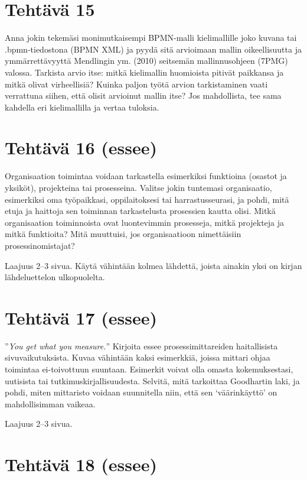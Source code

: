 \documentclass[
  finnish,
  letterpaper,
  DIV=11,
  numbers=noendperiod,
  oneside]{scrreprt}
\begin{document}
\section{Tehtävä 15}\label{tehtuxe4vuxe4-15}

Anna jokin tekemäsi monimutkaisempi BPMN-malli kielimallille joko kuvana
tai .bpmn-tiedostona (BPMN XML) ja pyydä sitä arvioimaan mallin
oikeellisuutta ja ymmärrettävyyttä Mendlingin ym. (2010) seitsemän
mallinnusohjeen (7PMG) valossa. Tarkista arvio itse: mitkä kielimallin
huomioista pitivät paikkansa ja mitkä olivat virheellisiä? Kuinka paljon
työtä arvion tarkistaminen vaati verrattuna siihen, että olisit
arvioinut mallin itse? Jos mahdollista, tee sama kahdella eri
kielimallilla ja vertaa tuloksia.

\section{Tehtävä 16 (essee)}\label{tehtuxe4vuxe4-16-essee}

Organisaation toimintaa voidaan tarkastella esimerkiksi funktioina
(osastot ja yksiköt), projekteina tai prosesseina. Valitse jokin
tuntemasi organisaatio, esimerkiksi oma työpaikkasi, oppilaitoksesi tai
harrastusseurasi, ja pohdi, mitä etuja ja haittoja sen toiminnan
tarkastelusta prosessien kautta olisi. Mitkä organisaation toiminnoista
ovat luontevimmin prosesseja, mitkä projekteja ja mitkä funktioita? Mitä
muuttuisi, jos organisaatioon nimettäisiin prosessinomistajat?

Laajuus 2--3 sivua. Käytä vähintään kolmea lähdettä, joista ainakin yksi
on kirjan lähdeluettelon ulkopuolelta.

\section{Tehtävä 17 (essee)}\label{tehtuxe4vuxe4-17-essee}

''\emph{You get what you measure.}'' Kirjoita essee prosessimittareiden
haitallisista sivuvaikutuksista. Kuvaa vähintään kaksi esimerkkiä,
joissa mittari ohjaa toimintaa ei-toivottuun suuntaan. Esimerkit voivat
olla omasta kokemuksestasi, uutisista tai tutkimuskirjallisuudesta.
Selvitä, mitä tarkoittaa Goodhartin laki, ja pohdi, miten mittaristo
voidaan suunnitella niin, että sen `väärinkäyttö' on mahdollisimman
vaikeaa.

Laajuus 2--3 sivua.

\section{Tehtävä 18 (essee)}\label{tehtuxe4vuxe4-18-essee}
\end{document}
